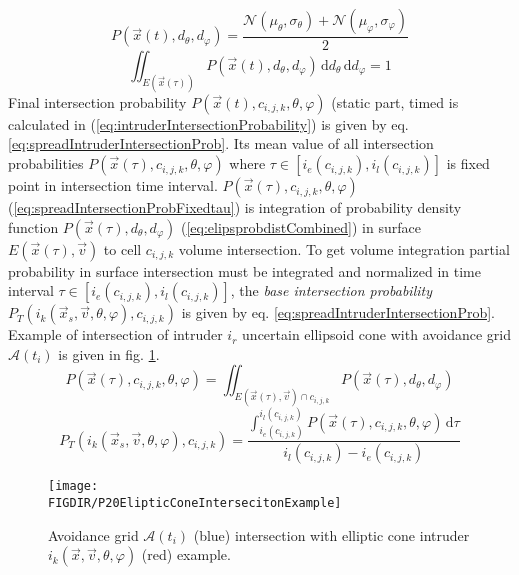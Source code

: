 \begin{equation}\label{eq:elipsprobdistCombined}
    P(\vec{x}(t),d_\theta,d_\varphi) = \frac{\mathscr{N}(\mu_\theta,\sigma_\theta)+\mathscr{N}(\mu_\varphi,\sigma_\varphi)}{2}
\end{equation}
\begin{equation}\label{eq:normalDistrobitionCondition}
    \iint_{E(\vec{x}(\tau))} P(\vec{x}(t),d_\theta,d_\varphi) \,\text{d}d_\theta\,\text{d}d_\varphi = 1
\end{equation}
\noindent Final intersection probability  $P(\vec{x}(t),c_{i,j,k},\theta,\varphi)$ (static part, timed is calculated in (\ref{eq:intruderIntersectionProbability}) is given by eq. \ref{eq:spreadIntruderIntersectionProb}. Its mean value of all intersection probabilities $P(\vec{x}(\tau),c_{i,j,k},\theta,\varphi)$ where $\tau\in[i_e(c_{i,j,k}),i_l(c_{i,j,k})]$ is fixed point in intersection time interval. $P(\vec{x}(\tau),c_{i,j,k},\theta,\varphi)$ (\ref{eq:spreadIntersectionProbFixedtau}) is integration of probability density function $P(\vec{x}(\tau),d_\theta,d_\varphi)$ (\ref{eq:elipsprobdistCombined}) in surface $E(\vec{x}(\tau),\vec{v})$ to cell $c_{i,j,k}$ volume intersection. To get volume integration partial probability in surface intersection must be integrated and normalized in time interval $\tau\in[i_e(c_{i,j,k}),i_l(c_{i,j,k})]$, the \emph{base intersection probability} $P_T(i_k(\vec{x}_s,\vec{v},\theta,\varphi),c_{i,j,k})$ is given by eq. \ref{eq:spreadIntruderIntersectionProb}. Example of intersection of intruder $i_r$ uncertain ellipsoid cone with avoidance grid $\mathscr{A}(t_i)$ is given in fig. \ref{fig:P20ElipticConeIntersecitonExample}.
\begin{equation}\label{eq:spreadIntersectionProbFixedtau}
    P(\vec{x}(\tau),c_{i,j,k},\theta,\varphi) =\iint_{E(\vec{x}(\tau),\vec{v})\cap c_{i,j,k}} P(\vec{x}(\tau),d_\theta,d_\varphi)
\end{equation}
\begin{equation}\label{eq:spreadIntruderIntersectionProb}
    P_T(i_k(\vec{x}_s,\vec{v},\theta,\varphi),c_{i,j,k})=\frac{\int_{i_e(c_{i,j,k})}^{i_l(c_{i,j,k})} P(\vec{x}(\tau),c_{i,j,k},\theta,\varphi)\,\text{d}\tau}{i_l(c_{i,j,k})-i_e(c_{i,j,k})}
\end{equation}
\begin{figure}[H]
    \centering
    \texttt{[image: \\FIGDIR/P20ElipticConeIntersecitonExample]}
    \caption{Avoidance grid $\mathscr{A}(t_i)$ (blue) intersection with elliptic cone intruder $i_k(\vec{x},\vec{v},\theta,\varphi)$ (red) example.}
    \label{fig:P20ElipticConeIntersecitonExample}
\end{figure}
